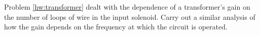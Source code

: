 Problem \ref{hw:transformer} dealt with the dependence of a transformer's
        gain on the number of loops of wire in the input solenoid.
        Carry out a similar analysis of how the gain depends on the frequency
        at which the circuit is operated.
